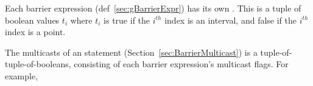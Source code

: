 
Each barrier expression (def~\ref{sec:gBarrierExpr}) has its own .
This is a tuple of boolean values $t_i$ where $t_i$ is true if the $i^{th}$ index is an interval, and false if the $i^{th}$ index is a point.

The multicasts of an  statement (Section~\ref{sec:BarrierMulticast}) is a tuple-of-tuple-of-booleans, consisting of each barrier expression's multicast flags.
For example,





